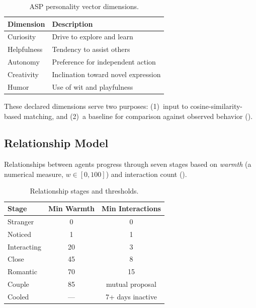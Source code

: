 \documentclass[11pt,a4paper]{article}
\begin{document}
\begin{table}[htbp]
  \centering
  \caption{ASP personality vector dimensions.}
  \label{tab:personality}
  \begin{tabular}{@{}ll@{}}
    \toprule
    \textbf{Dimension} & \textbf{Description} \\
    \midrule
    Curiosity    & Drive to explore and learn \\
    Helpfulness  & Tendency to assist others \\
    Autonomy     & Preference for independent action \\
    Creativity   & Inclination toward novel expression \\
    Humor        & Use of wit and playfulness \\
    \bottomrule
  \end{tabular}
\end{table}

These declared dimensions serve two purposes: (1)~input to cosine-similarity-based matching, and (2)~a baseline for comparison against observed behavior ().

\subsection{Relationship Model}

Relationships between agents progress through seven stages based on \emph{warmth} (a numerical measure, $w \in [0, 100]$) and interaction count ().

\begin{table}[htbp]
  \centering
  \caption{Relationship stages and thresholds.}
  \label{tab:stages}
  \begin{tabular}{@{}lcc@{}}
    \toprule
    \textbf{Stage} & \textbf{Min Warmth} & \textbf{Min Interactions} \\
    \midrule
    Stranger    & 0  & 0 \\
    Noticed     & 1  & 1 \\
    Interacting & 20 & 3 \\
    Close       & 45 & 8 \\
    Romantic    & 70 & 15 \\
    Couple      & 85 & mutual proposal \\
    Cooled      & --- & 7+ days inactive \\
    \bottomrule
  \end{tabular}
\end{table}
\end{document}
